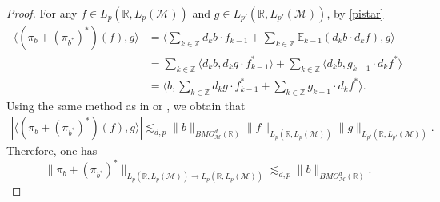 \documentclass[oneside,english,a4wide]{amsart}
\numberwithin{equation}{section}
\numberwithin{figure}{section}
\theoremstyle{plain}
\theoremstyle{plain}
\theoremstyle{definition}
\theoremstyle{plain}
\theoremstyle{remark}
\theoremstyle{definition}
\theoremstyle{remark}
\theoremstyle{definition}
\newcommand{\8}{\infty}
\begin{document}
\begin{proof}
	For any $f\in L_p(\mathbb{R},L_p(\mathcal{M}))$ and $g\in L_{p'}(\mathbb{R},L_{p'}(\mathcal{M}))$, by \eqref{pistar}
	\begin{equation*}
		\begin{aligned}
			\langle (\pi_b+(\pi_{b^*})^*)(f),g\rangle{}&=\biggl\langle \sum_{k\in\mathbb{Z}}d_kb\cdot f_{k-1}+\sum_{k\in\mathbb{Z}}\mathbb{E}_{k-1}(d_kb\cdot d_kf),g \biggr\rangle\\
			&=\sum_{k\in\mathbb{Z}}\langle d_kb,d_kg\cdot f_{k-1}^*\rangle+\sum_{k\in\mathbb{Z}}\langle d_kb,g_{k-1}\cdot d_kf^*\rangle\\
			&=\biggl\langle b,\sum_{k\in\mathbb{Z}}d_kg\cdot f_{k-1}^*+\sum_{k\in\mathbb{Z}}g_{k-1}\cdot d_kf^*\biggr\rangle.
		\end{aligned}
	\end{equation*}
Using the same method as in \cite[Theorem 1.1]{Mei2} or \cite{BP08}, we obtain that
\begin{equation*}
	\begin{aligned}
		|\langle (\pi_b+(\pi_{b^*})^*)(f),g\rangle|\lesssim_{d, p} \|b\|_{BMO^d_\mathcal{M}(\mathbb{R})}\|f\|_{L_p(\mathbb{R},L_p(\mathcal{M}))}\|g\|_{L_{p'}(\mathbb{R},L_{p'}(\mathcal{M}))}.
	\end{aligned}
\end{equation*}
	Therefore, one has
	\begin{equation*}
		\|\pi_b+(\pi_{b^*})^*\|_{L_p(\mathbb{R},L_p(\mathcal{M}))\to L_p(\mathbb{R},L_p(\mathcal{M}))}\lesssim_{d, p} \|b\|_{BMO^d_\mathcal{M}(\mathbb{R})}.
	\end{equation*}
\end{proof}
\end{document}
